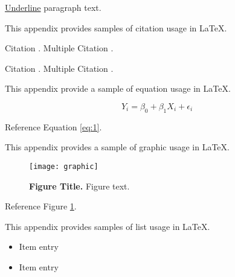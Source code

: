  \label{underlined-text}

\underline{Underline} paragraph text.


 \label{citations}

This appendix provides samples of citation usage in LaTeX.

 \label{bracket-citations}

Citation \citep{lastnamep:yearp}. Multiple Citation \citep{lastnamep:yearp,lastnamee:yeare,lastnamea:yeara}.

 \label{direct-citations}

Citation \citet{lastnamep:yearp}. Multiple Citation \citet{lastnamep:yearp,lastnamee:yeare,lastnamea:yeara}.


 \label{equations}

This appendix provide a sample of equation usage in LaTeX.

\begin{equation}
\label{eq:1}
	Y_i = \beta_0 + \beta_1 X_i + \epsilon_i
\end{equation}

Reference Equation \ref{eq:1}.


 \label{figures}

This appendix provides a sample of graphic usage in LaTeX.

\begin{figure}[hb] \centering
	\texttt{[image: graphic]}
	\caption{\textbf{Figure Title.} Figure text.}
	\label{figure:1}
\end{figure}

Reference Figure \ref{figure:1}.


 \label{lists}

This appendix provides samples of list usage in LaTeX.

 \label{unordered-lists}

\begin{itemize}
	\item Item entry
	\item Item entry
\end{itemize}

